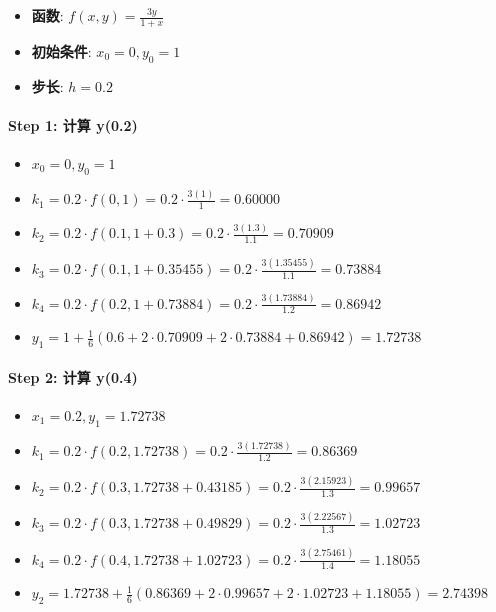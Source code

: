 \documentclass[11pt]{article}
\providecommand{\tightlist}{%
      \setlength{\itemsep}{0pt}\setlength{\parskip}{0pt}}
\begin{document}
\begin{itemize}
\tightlist
\item
  \textbf{函数}: \(f(x, y) = \frac{3y}{1+x}\)
\item
  \textbf{初始条件}: \(x_0 = 0, y_0 = 1\)
\item
  \textbf{步长}: \(h = 0.2\)
\end{itemize}

\paragraph{Step 1: 计算 y(0.2)}\label{step-1-ux8ba1ux7b97-y0.2-1}

\begin{itemize}
\tightlist
\item
  \(x_0 = 0, y_0 = 1\)
\item
  \(k_1 = 0.2 \cdot f(0, 1) = 0.2 \cdot \frac{3(1)}{1} = 0.60000\)
\item
  \(k_2 = 0.2 \cdot f(0.1, 1 + 0.3) = 0.2 \cdot \frac{3(1.3)}{1.1} = 0.70909\)
\item
  \(k_3 = 0.2 \cdot f(0.1, 1 + 0.35455) = 0.2 \cdot \frac{3(1.35455)}{1.1} = 0.73884\)
\item
  \(k_4 = 0.2 \cdot f(0.2, 1 + 0.73884) = 0.2 \cdot \frac{3(1.73884)}{1.2} = 0.86942\)
\item
  \(y_1 = 1 + \frac{1}{6}(0.6 + 2 \cdot 0.70909 + 2 \cdot 0.73884 + 0.86942) = \mathbf{1.72738}\)
\end{itemize}

\paragraph{Step 2: 计算 y(0.4)}\label{step-2-ux8ba1ux7b97-y0.4-1}

\begin{itemize}
\tightlist
\item
  \(x_1 = 0.2, y_1 = 1.72738\)
\item
  \(k_1 = 0.2 \cdot f(0.2, 1.72738) = 0.2 \cdot \frac{3(1.72738)}{1.2} = 0.86369\)
\item
  \(k_2 = 0.2 \cdot f(0.3, 1.72738 + 0.43185) = 0.2 \cdot \frac{3(2.15923)}{1.3} = 0.99657\)
\item
  \(k_3 = 0.2 \cdot f(0.3, 1.72738 + 0.49829) = 0.2 \cdot \frac{3(2.22567)}{1.3} = 1.02723\)
\item
  \(k_4 = 0.2 \cdot f(0.4, 1.72738 + 1.02723) = 0.2 \cdot \frac{3(2.75461)}{1.4} = 1.18055\)
\item
  \(y_2 = 1.72738 + \frac{1}{6}(0.86369 + 2 \cdot 0.99657 + 2 \cdot 1.02723 + 1.18055) = \mathbf{2.74398}\)
\end{itemize}
\end{document}

